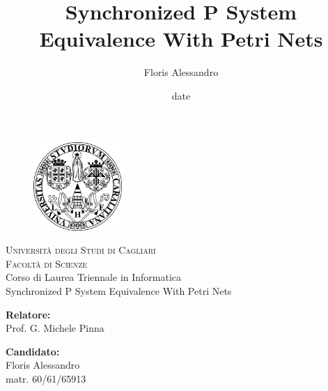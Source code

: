 \title{Synchronized P System Equivalence With Petri Nets}
\author{Floris Alessandro}
\date{date}

\begin{titlepage}
\begin{figure}[t]
    \centering\includegraphics[width=0.3\textwidth]{images/logo.png}
\end{figure}
\begin{center}
    \textsc{ \LARGE{Università degli Studi di Cagliari \\}}
	\textsc{ \LARGE{Facoltà di Scienze\\ }}
	\textnormal{ \LARGE{Corso di Laurea Triennale in Informatica\\}}
	\vspace{30mm}
	\fontsize{10mm}{7mm}\selectfont 
    \textup{Synchronized P System Equivalence With Petri Nets}\\
\end{center}

\vspace{25mm}

\begin{minipage}[t]{0.47\textwidth}
	\textnormal{\large{\bf Relatore:\\}}
	{\large Prof. G. Michele Pinna}
\end{minipage}\hfill\begin{minipage}[t]{0.47\textwidth}\raggedleft
	\textnormal{\large{\bf Candidato:\\}}
	{\large Floris Alessandro\\ matr. 60/61/65913}
\end{minipage}

\vspace{20mm}


\end{titlepage}
